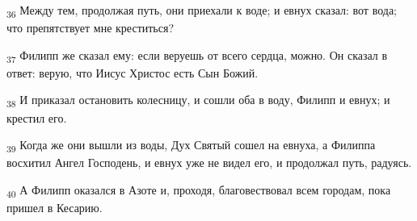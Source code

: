 \begin{tcolorbox}
\textsubscript{36} Между тем, продолжая путь, они приехали к воде; и евнух сказал: вот вода; что препятствует мне креститься?
\end{tcolorbox}
\begin{tcolorbox}
\textsubscript{37} Филипп же сказал ему: если веруешь от всего сердца, можно. Он сказал в ответ: верую, что Иисус Христос есть Сын Божий.
\end{tcolorbox}
\begin{tcolorbox}
\textsubscript{38} И приказал остановить колесницу, и сошли оба в воду, Филипп и евнух; и крестил его.
\end{tcolorbox}
\begin{tcolorbox}
\textsubscript{39} Когда же они вышли из воды, Дух Святый сошел на евнуха, а Филиппа восхитил Ангел Господень, и евнух уже не видел его, и продолжал путь, радуясь.
\end{tcolorbox}
\begin{tcolorbox}
\textsubscript{40} А Филипп оказался в Азоте и, проходя, благовествовал всем городам, пока пришел в Кесарию.
\end{tcolorbox}
